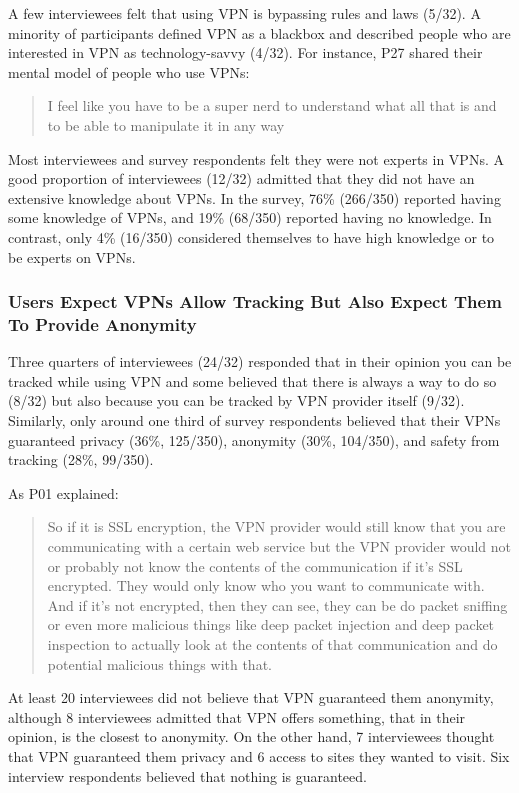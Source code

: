 A few interviewees felt that using VPN is
bypassing rules and laws (5/32). A minority of participants defined VPN as a blackbox and described people who are
interested in VPN as technology-savvy (4/32). For instance, P27 shared their mental model of
people who use VPNs: \begin{quote}I feel like you have to be a super nerd to  understand what all that is and to be able to manipulate it in any
way\end{quote}

Most interviewees and survey respondents felt they were not experts in VPNs. A good proportion of interviewees (12/32) admitted that they did not have an extensive knowledge
about VPNs. In the survey, 76\% (266/350) reported having some knowledge of
VPNs, and 19\% (68/350) reported having no knowledge. In contrast, only 4\%
(16/350) considered themselves to have high knowledge or to be experts on
VPNs.




\subsubsection{Users Expect VPNs Allow Tracking But Also Expect Them To Provide Anonymity} 
Three quarters of interviewees (24/32) responded that in their opinion you can be tracked
while using VPN and some believed that there is always a way to do so
(8/32) but also because you can be tracked by VPN provider itself (9/32). Similarly, only around one third of survey respondents believed that their VPNs guaranteed privacy (36\%,
125/350), anonymity (30\%, 104/350), and safety from tracking (28\%, 99/350).

As P01 explained:

\begin{quote}So if it is SSL encryption, the VPN provider would still know
that you are communicating with a certain web service but the VPN provider
would not or probably not know the contents of the communication if it's SSL
encrypted. They would only know who you want to communicate with. And if it's
not encrypted, then they can see, they can be do packet sniffing or even more
malicious things like deep packet injection and deep packet inspection to
actually look at the contents of that communication and do potential malicious
things with that. \end{quote}

At least 20 interviewees did not
believe that VPN guaranteed them anonymity, although 8 interviewees admitted
that VPN offers something, that in their opinion, is the closest to anonymity.
On the other hand, 7 interviewees thought that VPN guaranteed them privacy and
6 access to sites they wanted to visit. Six interview respondents believed
that nothing is guaranteed.

